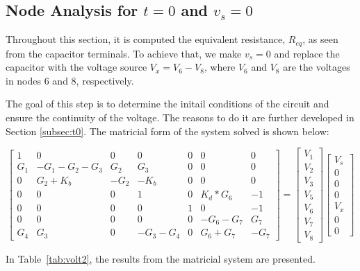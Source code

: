 \newpage
\subsection{Node Analysis for $t=0$ and $v_{s}=0$}
\label{subsec:t=0}

Throughout this section, it is computed the equivalent resistance, $R_{eq}$, as seen from
the capacitor terminals. To achieve that, we make $v_{s}=0$ and replace the capacitor
with the voltage source $V_{x}=V_{6}-V_{8}$, where $V_6$ and $V_8$ are the voltages
in nodes 6 and 8, respectively.\par
The goal of this step is to determine the initail conditions of the circuit and ensure the continuity of the voltage. The reasons to do it are further developed in Section \ref{subsec:t0}.
The matricial form of the system solved is shown below:\par

$$
\begin{bmatrix}
  1 & 0 & 0 & 0 & 0 & 0 & 0 \\
  G_{1} & -G_{1}-G_{2}-G_{3} & G_{2} & G_{3} & 0 & 0 & 0 \\
  0 & G_{2}+K_{b} & -G_{2} & -K_{b} & 0 & 0 & 0 \\
  0 & 0 & 0 & 1 & 0 & K_{d}*G_{6} & -1 \\
  0 & 0 & 0 & 0 & 1 & 0 & -1 \\
  0 & 0 & 0 & 0 & 0 & -G_{6}-G_{7} & G_{7} \\
  G_{4} & G_{3} & 0 & -G_{3}-G_{4} & 0 & G_{6}+G_{7} & -G_{7}
\end{bmatrix}
=
\begin{bmatrix}
  V_{1}\\
  V_{2}\\
  V_{3}\\
  V_{5}\\
  V_{6}\\
  V_{7}\\
  V_{8}
\end{bmatrix}
\begin{bmatrix}
  V_{s}\\
  0\\
  0\\
  0\\
  V_{x}\\
  0\\
  0
\end{bmatrix}
$$

In Table~\ref{tab:volt2}, the results from the matricial system are presented.\par

